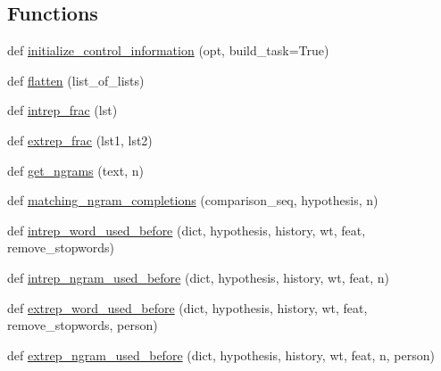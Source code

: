 \subsection*{Functions}
\begin{DoxyCompactItemize}
\item 
def \hyperlink{namespaceprojects_1_1controllable__dialogue_1_1controllable__seq2seq_1_1controls_aafbe257df1791349439cc63c99de8b5e}{initialize\+\_\+control\+\_\+information} (opt, build\+\_\+task=True)
\item 
def \hyperlink{namespaceprojects_1_1controllable__dialogue_1_1controllable__seq2seq_1_1controls_a0db4b9d9584cef90aa2515a75e741774}{flatten} (list\+\_\+of\+\_\+lists)
\item 
def \hyperlink{namespaceprojects_1_1controllable__dialogue_1_1controllable__seq2seq_1_1controls_a6774bd6ac8941123de4574e69686140a}{intrep\+\_\+frac} (lst)
\item 
def \hyperlink{namespaceprojects_1_1controllable__dialogue_1_1controllable__seq2seq_1_1controls_a24fbafb2553fb93db247bb7e2339b1e4}{extrep\+\_\+frac} (lst1, lst2)
\item 
def \hyperlink{namespaceprojects_1_1controllable__dialogue_1_1controllable__seq2seq_1_1controls_abf6d099074de6b0c663333470eeaa2de}{get\+\_\+ngrams} (text, n)
\item 
def \hyperlink{namespaceprojects_1_1controllable__dialogue_1_1controllable__seq2seq_1_1controls_ab562827e4a16578079aa8121ebadcda7}{matching\+\_\+ngram\+\_\+completions} (comparison\+\_\+seq, hypothesis, n)
\item 
def \hyperlink{namespaceprojects_1_1controllable__dialogue_1_1controllable__seq2seq_1_1controls_a42b08e3d8604f6e0b7d88230323cd777}{intrep\+\_\+word\+\_\+used\+\_\+before} (dict, hypothesis, history, wt, feat, remove\+\_\+stopwords)
\item 
def \hyperlink{namespaceprojects_1_1controllable__dialogue_1_1controllable__seq2seq_1_1controls_a96e1d28cd5e6769d118b0b8b339213e9}{intrep\+\_\+ngram\+\_\+used\+\_\+before} (dict, hypothesis, history, wt, feat, n)
\item 
def \hyperlink{namespaceprojects_1_1controllable__dialogue_1_1controllable__seq2seq_1_1controls_a1d20bea2946cab3a79aa8a2e77f9e09b}{extrep\+\_\+word\+\_\+used\+\_\+before} (dict, hypothesis, history, wt, feat, remove\+\_\+stopwords, person)
\item 
def \hyperlink{namespaceprojects_1_1controllable__dialogue_1_1controllable__seq2seq_1_1controls_a5bc41cc6c701b5da46a74b17ead0e834}{extrep\+\_\+ngram\+\_\+used\+\_\+before} (dict, hypothesis, history, wt, feat, n, person)

\end{DoxyCompactItemize}
